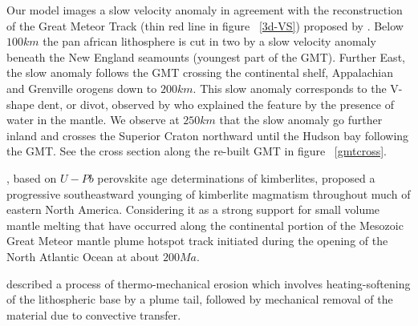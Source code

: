 \documentclass[12pt]{article}
\begin{document}
	Our model images a slow velocity anomaly in agreement with the reconstruction of the Great Meteor Track (thin red line in figure ~\ref{3d-VS}) proposed by \cite{heaman2000timing}.
	Below $100km$ the pan african lithosphere is cut in two by a slow velocity anomaly beneath the New England seamounts (youngest part of the GMT). Further East, the slow anomaly follows the GMT crossing the continental shelf, Appalachian and Grenville orogens down to $200km$. 
	This slow anomaly corresponds to the V-shape dent, or divot, observed by \cite{lee1997upper} who explained the feature by the presence of water in the mantle. 
	We observe at $250km$ that the slow anomaly go further inland and crosses the Superior Craton northward until the Hudson bay following the GMT.
	See the cross section along the re-built GMT in figure ~\ref{gmtcross}.

	\cite{heaman2000timing}, based on $U-Pb$ perovskite age determinations of kimberlites, proposed a progressive southeastward younging of kimberlite magmatism throughout much of eastern North America. Considering it as a strong support for small volume mantle melting that have occurred along the continental portion of the Mesozoic Great Meteor mantle plume hotspot track initiated during the opening of the North Atlantic Ocean at about $200Ma$. \citep[See figure 4. in][]{heaman2000timing}

	\cite{davies1994thermomechanical} described a process of thermo-mechanical erosion which involves heating-softening of the lithospheric base by a plume tail, followed by mechanical removal of the material due to convective transfer. \citep{rondenay2000lithospheric}
\end{document}
